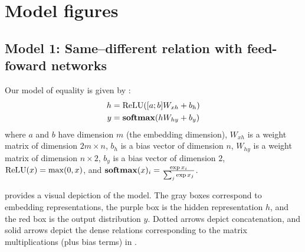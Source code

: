 %


\section{Model figures}


\subsection{Model 1: Same--different relation with feed-foward  networks}\label{sec:model1}

Our model of equality is given by :
%
\begin{align}
  h &= \operatorname{ReLU}([a;b]W_{xh} + b_{h}) \label{eq:x2h-supp}\\
  y &= \mathbf{softmax}(hW_{hy} + b_{y}) \label{eq:h2y-supp}
\end{align}
%
where $a$ and $b$ have dimension $m$ (the embedding dimension), $W_{xh}$ is a weight matrix of dimension $2m \times n$, $b_{h}$ is a bias vector of dimension $n$, $W_{hy}$ is a weight matrix of dimension $n \times 2$, $b_{y}$ is a bias vector of dimension $2$, $\operatorname{ReLU}(x) = \max(0, x)$, and $\mathbf{softmax}(x)_{i} = \frac{\exp{x_{i}}}{\sum_{j} \exp{x_{j}}}$.

 provides a visual depiction of the model. The gray boxes correspond to embedding representations, the purple box is the hidden representation $h$, and the red box is the output distribution $y$. Dotted arrows depict concatenation, and solid arrows depict the dense relations corresponding to the matrix multiplications (plus bias terms) in .

